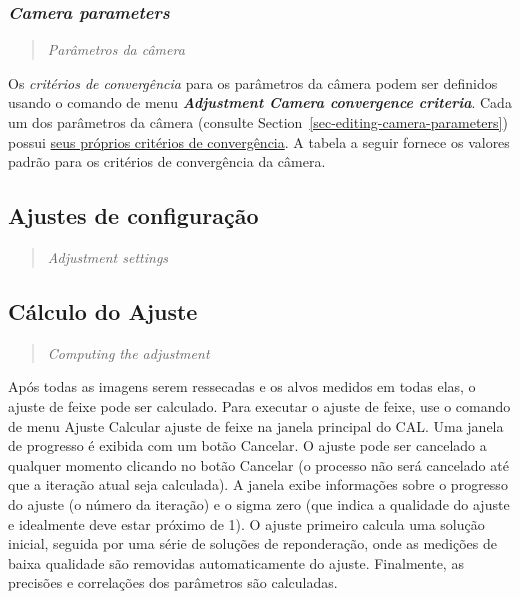 \documentclass[
  12pt,
  letterpaper,
  DIV=11,
  numbers=noendperiod]{scrreprt}
\begin{document}
\subsubsection{\texorpdfstring{\emph{Camera
parameters}}{Camera parameters}}\label{camera-parameters-1}

\begin{quote}
\emph{Parâmetros da câmera}
\end{quote}

Os \emph{critérios de convergência} para os parâmetros da câmera podem
ser definidos usando o comando de menu \textbf{\emph{Adjustment
\textbar{} Camera convergence criteria}}. Cada um dos parâmetros da
câmera (consulte Section~\ref{sec-editing-camera-parameters}) possui
\ul{seus próprios critérios de convergência}. A tabela a seguir fornece
os valores padrão para os critérios de convergência da câmera.

\subsection{Ajustes de
configuração}\label{ajustes-de-configurauxe7uxe3o-1}

\begin{quote}
\emph{Adjustment settings}
\end{quote}

\subsection{Cálculo do Ajuste}\label{cuxe1lculo-do-ajuste}

\begin{quote}
\emph{Computing the adjustment}
\end{quote}

Após todas as imagens serem ressecadas e os alvos medidos em todas elas,
o ajuste de feixe pode ser calculado. Para executar o ajuste de feixe,
use o comando de menu Ajuste \textbar{} Calcular ajuste de feixe na
janela principal do CAL. Uma janela de progresso é exibida com um botão
Cancelar. O ajuste pode ser cancelado a qualquer momento clicando no
botão Cancelar (o processo não será cancelado até que a iteração atual
seja calculada). A janela exibe informações sobre o progresso do ajuste
(o número da iteração) e o sigma zero (que indica a qualidade do ajuste
e idealmente deve estar próximo de 1). O ajuste primeiro calcula uma
solução inicial, seguida por uma série de soluções de reponderação, onde
as medições de baixa qualidade são removidas automaticamente do ajuste.
Finalmente, as precisões e correlações dos parâmetros são calculadas.
\end{document}
